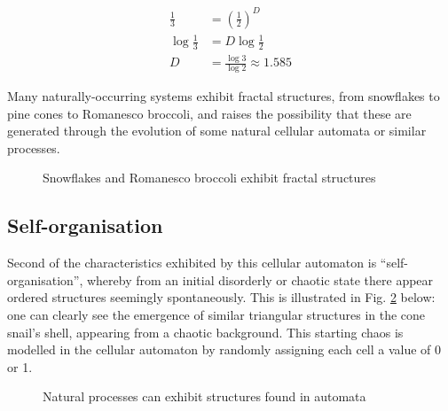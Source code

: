 \documentclass[11pt,a4paper]{article}
\begin{document}
    \begin{equation}
        \label{sierpinskiDim}
        \begin{split}
            \tfrac{1}{3} &= (\tfrac{1}{2})^D \\
            \log{\tfrac{1}{3}} &= D \log{\tfrac{1}{2}} \\
            D &= \tfrac{\log{3}}{\log{2}} \approx 1.585
        \end{split}
    \end{equation}

    Many naturally-occurring systems exhibit fractal structures, from snowflakes
    to pine cones to Romanesco broccoli, and raises the possibility that these
    are generated through the evolution of some natural cellular automata or
    similar processes.

    \begin{figure}[h]%
        \centering
        \qquad
        \caption{Snowflakes and Romanesco broccoli exhibit fractal structures}%
        \label{fig:nature_fractals}%
    \end{figure}

    \subsection{Self-organisation}
    Second of the characteristics exhibited by this cellular automaton is
    ``self-organisation'', whereby from an initial disorderly or chaotic state
    there appear ordered structures seemingly spontaneously. This is illustrated
    in Fig. \ref{fig:self-organisation} below: one can clearly see the emergence
    of similar triangular structures in the cone snail's shell, appearing from a
    chaotic background. This starting chaos is modelled in the cellular
    automaton by randomly assigning each cell a value of 0 or 1.

    \begin{figure}[h]%
        \centering
        \qquad
        \caption{Natural processes can exhibit structures found in automata}
        \label{fig:self-organisation}
    \end{figure}
\end{document}
